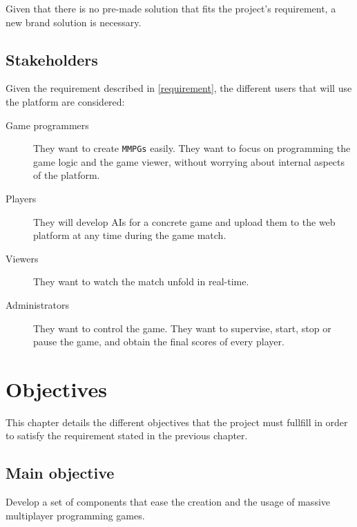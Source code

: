 \documentclass[a4paper,11pt,titlepage,abstract,numbers=noenddot,automark,mnsy,intlimits,rgb,dvipsnames]{report}
\begin{document}
Given that there is no pre-made solution that fits the project's requirement, a new brand solution is necessary.
\section{Stakeholders}
Given the requirement described in \autoref{requirement}, the different users that will use the platform are considered:
\begin{description}
\item[Game programmers]
They want to create \texttt{MMPGs} easily. They want to focus on programming the game logic and the
  game viewer, without worrying about internal aspects of the platform.
\item[Players]
They will develop \texttt{}AI\texttt{}s for a concrete game and upload them to the web platform at any time during
  the game match.
\item[Viewers]
They want to watch the match unfold in real-time.
\item[Administrators]
They want to control the game. They want to supervise, start, stop or pause the game, and obtain
  the final scores of every player.
\end{description}
\clearpage
\chapter{Objectives}
\label{specification}
This chapter details the different objectives that the project must fullfill in order to satisfy the requirement stated in
the previous chapter.
\section{Main objective}
Develop a set of components that ease the creation and the usage of massive multiplayer programming games.
\end{document}
